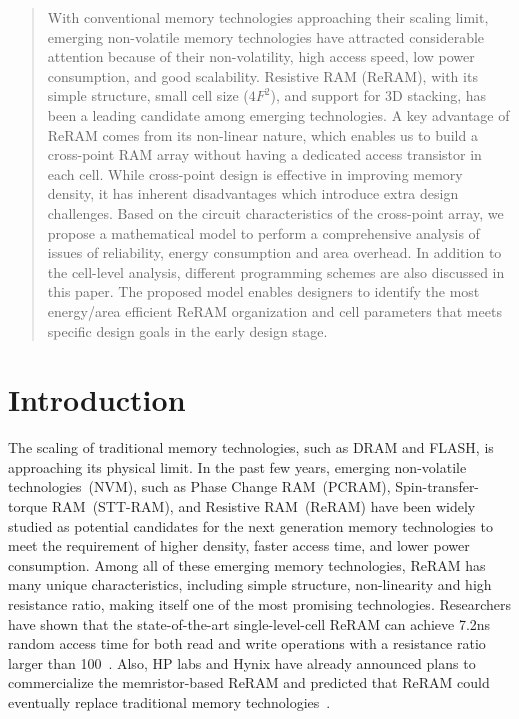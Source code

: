 \begin{abstract}
With conventional memory technologies approaching their scaling limit,
emerging non-volatile memory technologies have attracted considerable
attention because of their non-volatility, high access speed, low power
consumption, and good scalability. Resistive RAM (ReRAM), with its simple
structure, small cell size ($4F^2$), and support for 3D stacking, has been
a leading candidate among emerging technologies. A key advantage of ReRAM
comes from its non-linear nature, which enables us to build a cross-point
RAM array without having a dedicated access transistor in each cell. While
cross-point design is effective in improving memory density, it has
inherent disadvantages which introduce extra design challenges. Based on
the circuit characteristics of the cross-point array, we propose a
mathematical model to perform a comprehensive analysis of issues of
reliability, energy consumption and area overhead. In addition to the
cell-level analysis, different programming schemes are also discussed in
this paper. The proposed model enables designers to identify the most
energy/area efficient ReRAM organization and cell parameters that meets
specific design goals in the early design stage.
\end{abstract}

\section{Introduction}\label{sec:intro}
The scaling of traditional memory technologies, such as DRAM and FLASH, is
approaching its physical limit. In the past few years, emerging
non-volatile technologies~(NVM), such as Phase Change RAM~(PCRAM),
Spin-transfer-torque RAM~(STT-RAM), and Resistive RAM~(ReRAM) have been widely
studied as potential candidates for the next generation memory
technologies to meet the requirement of higher density, faster access time, and
lower power consumption. Among all of these emerging memory technologies,
ReRAM has many unique characteristics, including simple structure,
non-linearity and high resistance ratio, making itself one of the most
promising technologies. Researchers have shown that the state-of-the-art
single-level-cell ReRAM can achieve 7.2ns random access time for both
read and write operations with a resistance ratio larger than
100~\cite{ReRAM_ISSCC2011_Sheu}. Also, HP labs and Hynix have already
announced plans to commercialize the memristor-based ReRAM and predicted
that ReRAM could eventually replace traditional memory
technologies~\cite{memristor:HpHynix}.


